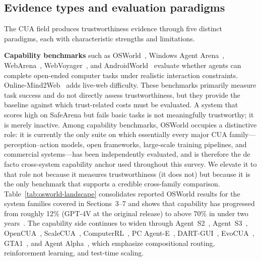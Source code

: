 \subsection{Evidence types and evaluation paradigms}

The CUA field produces trustworthiness evidence through five distinct paradigms, each with characteristic strengths and limitations.

\textbf{Capability benchmarks} such as OSWorld~\cite{osworld2024}, Windows Agent Arena~\cite{windowsarena2024}, WebArena~\cite{webarena2023}, WebVoyager~\cite{webvoyager2024}, and AndroidWorld~\cite{androidworld2024} evaluate whether agents can complete open-ended computer tasks under realistic interaction constraints. Online-Mind2Web~\cite{onlinemind2web2025} adds live-web difficulty. These benchmarks primarily measure task success and do not directly assess trustworthiness, but they provide the baseline against which trust-related costs must be evaluated. A system that scores high on SafeArena but fails basic tasks is not meaningfully trustworthy; it is merely inactive. Among capability benchmarks, OSWorld occupies a distinctive role: it is currently the only suite on which essentially every major CUA family---perception--action models, open frameworks, large-scale training pipelines, and commercial systems---has been independently evaluated, and is therefore the de facto cross-system capability anchor used throughout this survey. We elevate it to that role not because it measures trustworthiness (it does not) but because it is the only benchmark that supports a credible cross-family comparison. Table~\ref{tab:osworld-landscape} consolidates reported OSWorld results for the system families covered in Sections~3--7 and shows that capability has progressed from roughly 12\% (GPT-4V at the original release) to above 70\% in under two years~\cite{osworld2024,agents32026,anthropicclaude46}. The capability side continues to widen through Agent~S2~\cite{agents22025}, Agent~S3~\cite{agents32026}, OpenCUA~\cite{opencua2025}, ScaleCUA~\cite{scalecua2025}, ComputerRL~\cite{computerrl2025}, PC Agent-E~\cite{pcaegente2025}, DART-GUI~\cite{dartgui2025}, EvoCUA~\cite{evocua2026}, GTA1~\cite{gta12025}, and Agent Alpha~\cite{agentalpha2026}, which emphasize compositional routing, reinforcement learning, and test-time scaling.


